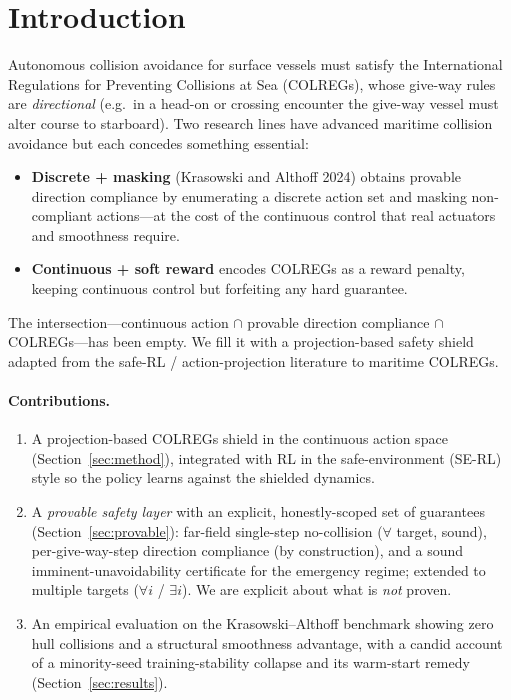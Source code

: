 \documentclass[12pt,letterpaper]{article}
\theoremstyle{remark}\newtheorem*{scope}{Scope and honest limits}
\begin{document}
\section{Introduction}
Autonomous collision avoidance for surface vessels must satisfy the International
Regulations for Preventing Collisions at Sea (COLREGs), whose give-way rules are
\emph{directional} (e.g.\ in a head-on or crossing encounter the give-way vessel
must alter course to starboard). Two research lines have advanced maritime
collision avoidance but each concedes something essential:
\begin{itemize}
  \item \textbf{Discrete + masking} (Krasowski and Althoff 2024) obtains
  provable direction compliance by enumerating a discrete action set and masking
  non-compliant actions---at the cost of the continuous control that real actuators
  and smoothness require.
  \item \textbf{Continuous + soft reward} encodes COLREGs as a reward penalty,
  keeping continuous control but forfeiting any hard guarantee.
\end{itemize}
The intersection---continuous action $\cap$ provable direction compliance $\cap$
COLREGs---has been empty. We fill it with a projection-based safety shield adapted
from the safe-RL / action-projection literature to maritime COLREGs.

\paragraph{Contributions.}
\begin{enumerate}
  \item A projection-based COLREGs shield in the continuous action space
  (Section~\ref{sec:method}), integrated with RL in the safe-environment (SE-RL)
  style so the policy learns against the shielded dynamics.
  \item A \emph{provable safety layer} with an explicit, honestly-scoped set of
  guarantees (Section~\ref{sec:provable}): far-field single-step no-collision
  ($\forall$ target, sound), per-give-way-step direction compliance (by
  construction), and a sound imminent-unavoidability certificate for the emergency
  regime; extended to multiple targets ($\forall i$ / $\exists i$). We are explicit
  about what is \emph{not} proven.
  \item An empirical evaluation on the Krasowski--Althoff benchmark showing zero
  hull collisions and a structural smoothness advantage, with a candid account of a
  minority-seed training-stability collapse and its warm-start remedy
  (Section~\ref{sec:results}).
\end{enumerate}
\end{document}
